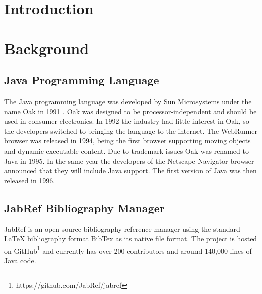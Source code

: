 



%

%
%
\tableofcontents
\newpage
\fancyhead[LO]{\footnotesize\sc\nouppercase{\leftmark}}
\setcounter{page}{1}
%
%
\hypertarget{introduction}{%
\section{Introduction}\label{introduction}}

\hypertarget{background}{%
\section{Background}\label{background}}

\hypertarget{java-programming-language}{%
\subsection{Java Programming Language}\label{java-programming-language}}

The Java programming language was developed by Sun Microsystems under
the name Oak in 1991 \autocite{Oracle2015}. Oak was designed to be
processor-independent and should be used in consumer electronics. In
1992 the industry had little interest in Oak, so the developers switched
to bringing the language to the internet. The WebRunner browser was
released in 1994, being the first browser supporting moving objects and
dynamic executable content. Due to trademark issues Oak was renamed to
Java in 1995. In the same year the developers of the Netscape Navigator
browser announced that they will include Java support. The first version
of Java was then released in 1996.

\hypertarget{jabref-bibliography-manager}{%
\subsection{JabRef Bibliography
Manager}\label{jabref-bibliography-manager}}

JabRef is an open source bibliography reference manager using the
standard LaTeX bibliography format BibTex as its native file format. The
project is hosted on GitHub\footnote{https://github.com/JabRef/jabref}
and currently has over 200 contributors and around 140,000 lines of Java
code.
\newpage


\printbibliography[heading=bibintoc]


